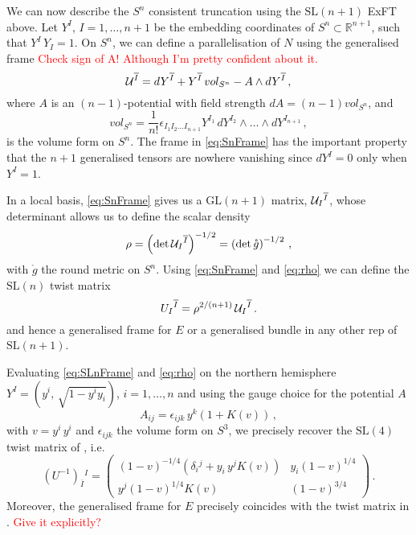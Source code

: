 \documentclass[a4paper, 11pt]{article}
\numberwithin{equation}{section}
\newcommand{\ov}[1]{\overline{#1}}
\newcommand{\SL}[1]{\mathrm{SL}( #1 )}
\newcommand{\GL}[1]{\mathrm{GL}( #1 )}
\newcommand{\+}{\oplus}
\newcommand{\cU}{{\cal U}}
\newcommand{\UI}{\left(U^{-1}\right)}
\newcommand{\fl}[1]{\ov{#1}}
\newcommand{\EM}[1]{\textcolor{red}{#1}}
\begin{document}
We can now describe the $S^n$ consistent truncation using the $\SL{n+1}$ ExFT above. Let $Y^I$, $I = 1, \ldots, n+1$ be the embedding coordinates of $S^{n} \subset \mathbb{R}^{n+1}$, such that $Y^I\, Y_I = 1$. On $S^n$, we can define a parallelisation of $N$ using the generalised frame \EM{Check sign of A! Although I'm pretty confident about it.}
\begin{equation}\label{eq:SnFrame}
	\cU^{\fl{I}} = dY^{\fl{I}} + Y^{\fl{I}}\, vol_{S^n} - A \wedge dY^{\fl{I}} \,,
\end{equation}
where $A$ is an $(n-1)$-potential with field strength $dA = (n-1) vol_{S^n}$, and
\begin{equation}
	vol_{S^n} = \frac{1}{n!}\epsilon_{I_1 I_2 \ldots I_{n+1}} Y^{I_1}\, dY^{I_2} \wedge \ldots \wedge dY^{I_{n+1}} \,,
\end{equation}
is the volume form on $S^n$. The frame in \eqref{eq:SnFrame} has the important property that the $n+1$ generalised tensors are nowhere vanishing since $dY^I = 0$ only when $Y^I = 1$.

In a local basis, \eqref{eq:SnFrame} gives us a $\GL{n+1}$ matrix, $\cU_I{}^{\fl{I}}$, whose determinant allows us to define the scalar density
\begin{equation} \label{eq:rho}
	\rho = \left(\det \cU_I{}^{\fl{I}}\right)^{-1/2} = \left(\det \mathring{g}\right)^{-1/2} \,,
\end{equation}
with $\mathring{g}$ the round metric on $S^n$. Using \eqref{eq:SnFrame} and \eqref{eq:rho} we can define the $\SL{n}$ twist matrix
\begin{equation} \label{eq:SLnFrame}
	U_I{}^{\fl{I}} = \rho^{2/(n+1)}\, \cU_I{}^{\fl{I}} \,.
\end{equation}
and hence a generalised frame for $E$ or a generalised bundle in any other rep of $\SL{n+1}$.

Evaluating \eqref{eq:SLnFrame} and \eqref{eq:rho} on the northern hemisphere $Y^I = \left( y^i,\, \sqrt{1-y^i y_i}\right)$, $i = 1, \ldots, n$ and using the gauge choice for the potential $A$
\begin{equation}
	A_{ij} = \epsilon_{ijk}\, y^k (1 + K(v)) \,,
\end{equation}
with $v = y^i\, y^i$ and $\epsilon_{ijk}$ the volume form on $S^3$, we precisely recover the $\SL{4}$ twist matrix of \cite{Hohm:2014qga}, i.e.
\begin{equation} \label{eq:SLnTwist}
	\UI_{\fl{I}}{}^I = \begin{pmatrix}
		\left(1-v\right)^{-1/4} \left( \delta_i{}^j + y_i\, y^j K(v) \right) & y_i \left(1-v\right)^{1/4} \\
		y^j \left(1-v\right)^{1/4} K(v) & \left(1-v\right)^{3/4}
	\end{pmatrix} \,.
\end{equation}
Moreover, the generalised frame for $E$ precisely coincides with the twist matrix in \cite{Lee:2014mla,Baguet:2015iou}. \EM{Give it explicitly?}
\end{document}
